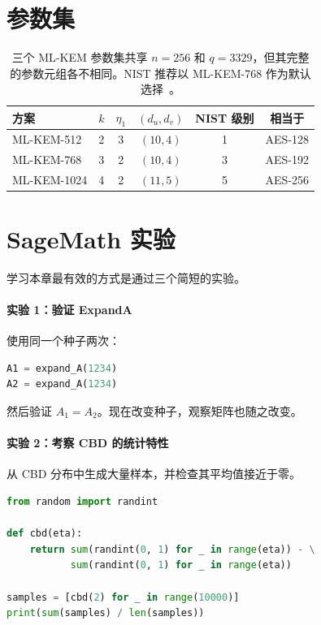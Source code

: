 \section{参数集}
\begin{table}[H]
\centering
\begin{tabular}{lccccc}
\toprule
方案 & $k$ & $\eta_1$ & $(d_u,d_v)$ & NIST 级别 & 相当于 \\
\midrule
ML-KEM-512  & 2 & 3 & $(10,4)$ & 1 & AES-128 \\
ML-KEM-768  & 3 & 2 & $(10,4)$ & 3 & AES-192 \\
ML-KEM-1024 & 4 & 2 & $(11,5)$ & 5 & AES-256 \\
\bottomrule
\end{tabular}
\caption{三个 ML-KEM 参数集共享 $n=256$ 和 $q=3329$，但其完整的参数元组各不相同。NIST 推荐以 ML-KEM-768 作为默认选择~\cite{nistir8547}。}
\label{tab:mlkem-params}
\end{table}

\section{SageMath 实验}

学习本章最有效的方式是通过三个简短的实验。

\paragraph{实验 1：验证 ExpandA}

使用同一个种子两次：

\begin{lstlisting}[language=Python]
A1 = expand_A(1234)
A2 = expand_A(1234)
\end{lstlisting}

然后验证 \(A_1 = A_2\)。现在改变种子，观察矩阵也随之改变。

\paragraph{实验 2：考察 CBD 的统计特性}

从 CBD 分布中生成大量样本，并检查其平均值接近于零。

\begin{lstlisting}[language=Python]
from random import randint

def cbd(eta):
    return sum(randint(0, 1) for _ in range(eta)) - \
           sum(randint(0, 1) for _ in range(eta))

samples = [cbd(2) for _ in range(10000)]
print(sum(samples) / len(samples))
\end{lstlisting}


